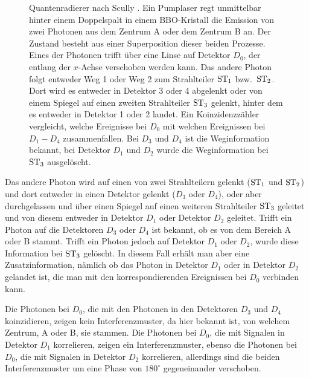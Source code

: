 \begin{figure}[htb]
\caption{\label{fig_Scully}%
Quantenradierer nach Scully \cite{Kim}. Ein Pumplaser regt unmittelbar hinter einem Doppelspalt in einem
BBO-Kristall die Emission von zwei Photonen aus dem Zentrum A oder dem Zentrum B an. Der Zustand besteht
aus einer Superposition dieser beiden Prozesse. Eines der Photonen trifft \"uber eine Linse auf 
Detektor $D_0$, der entlang
der $x$-Achse verschoben werden kann. Das andere Photon folgt entweder Weg 1 oder Weg 2 zum
Strahlteiler ${\rm ST}_1$ bzw.\ ${\rm ST}_2$. Dort wird es entweder in Detektor 3 oder 4 abgelenkt oder
von einem Spiegel auf einen zweiten Strahlteiler ${\rm ST}_3$ gelenkt, hinter dem es entweder in
Detektor 1 oder 2 landet. Ein Koinzidenzz\"ahler vergleicht, welche Ereignisse bei $D_0$ mit welchen
Ereignissen bei $D_1-D_4$ zusammenfallen. Bei $D_3$ und $D_4$ ist die Weginformation bekannt, bei
Detektor $D_1$ und $D_2$ wurde die Weginformation bei ${\rm ST}_3$ ausgel\"oscht.}
\end{figure}

Das andere Photon wird auf einen von zwei Strahlteilern gelenkt (${\rm ST}_1$ und ${\rm ST}_2$)
und dort entweder in einen Detektor gelenkt ($D_3$ oder $D_4$), oder aber durchgelassen
und \"uber einen Spiegel auf einen weiteren Strahlteiler ${\rm ST}_3$ geleitet und von diesem
entweder in Detektor $D_1$ oder Detektor $D_2$ geleitet. Trifft ein Photon auf die Detektoren
$D_3$ oder $D_4$ ist bekannt, ob es von dem Bereich A oder B stammt. Trifft ein Photon jedoch
auf Detektor $D_1$ oder $D_2$, wurde diese Information bei ${\rm ST}_3$ gel\"oscht. In diesem
Fall erh\"alt man aber eine Zusatzinformation, n\"amlich ob das Photon
in Detektor $D_1$ oder in Detektor $D_2$ gelandet ist, die man mit den korrespondierenden 
Ereignissen bei $D_0$ verbinden kann. 

Die Photonen bei $D_0$, die mit den Photonen in den Detektoren $D_3$ und $D_4$
koinzidieren, zeigen kein Interferenzmuster, da hier bekannt ist, von welchem Zentrum,
A oder B, sie stammen. 
Die Photonen bei $D_0$, die mit Signalen in Detektor $D_1$ korrelieren, zeigen ein Interferenzmuster,
ebenso die Photonen bei $D_0$, die mit Signalen in Detektor $D_2$ korrelieren, allerdings sind die
beiden Interferenzmuster um eine Phase von $180^\circ$ gegeneinander verschoben. 

